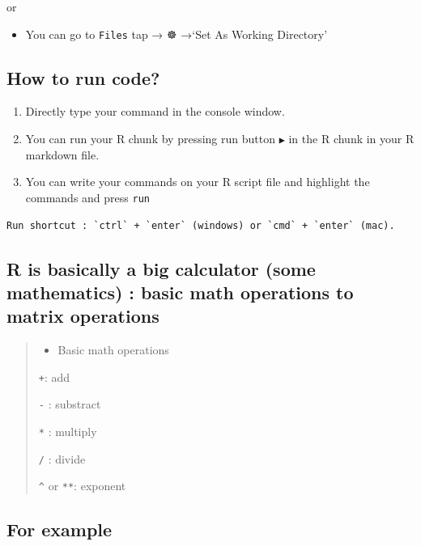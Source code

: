 \documentclass[
]{article}
\providecommand{\tightlist}{%
  \setlength{\itemsep}{0pt}\setlength{\parskip}{0pt}}
\begin{document}
or

\begin{itemize}
\tightlist
\item
  You can go to \texttt{Files} tap → ☸︎ →`Set As Working Directory'
\end{itemize}

\subsection{How to run code?}\label{how-to-run-code}

\begin{enumerate}
\def\labelenumi{\arabic{enumi}.}
\item
  Directly type your command in the console window.
\item
  You can run your R chunk by pressing run button \texttt{▶} in the R
  chunk in your R markdown file.
\item
  You can write your commands on your R script file and highlight the
  commands and press \texttt{run}
\end{enumerate}

\begin{verbatim}
Run shortcut : `ctrl` + `enter` (windows) or `cmd` + `enter` (mac).
\end{verbatim}

\subsection{R is basically a big calculator (some mathematics) : basic
math operations to matrix
operations}\label{r-is-basically-a-big-calculator-some-mathematics-basic-math-operations-to-matrix-operations}

\begin{quote}
\begin{itemize}
\tightlist
\item
  Basic math operations
\end{itemize}

\texttt{+}: add

\texttt{-} : substract

\texttt{*} : multiply

\texttt{/} : divide

\texttt{\^{}} or \texttt{**}: exponent
\end{quote}

\subsection{For example}\label{for-example}
\end{document}
